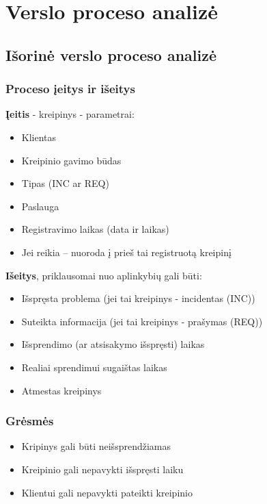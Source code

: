\section{Verslo proceso analizė}

	\subsection{Išorinė verslo proceso analizė}

		\subsubsection{Proceso įeitys ir išeitys}

			\textbf{Įeitis} - kreipinys - parametrai:
			\begin{itemize}
				\item Klientas
				\item Kreipinio gavimo būdas
				\item Tipas (INC ar REQ)
				\item Paslauga
				\item Registravimo laikas (data ir laikas)
				\item Jei reikia – nuoroda į prieš tai registruotą kreipinį
			\end{itemize}

			\textbf{Išeitys}, priklausomai nuo aplinkybių gali būti:
			\begin{itemize}
				\item Išspręsta problema (jei tai kreipinys - incidentas (INC))
				\item Suteikta informacija (jei tai kreipinys - prašymas (REQ))
				\item Išsprendimo (ar atsisakymo išspręsti) laikas
				\item Realiai sprendimui sugaištas laikas
				\item Atmestas kreipinys
			\end{itemize}

		\subsubsection{Grėsmės}
		
			\begin{itemize}
				\item Kripinys gali būti neišsprendžiamas
				\item Kreipinio gali nepavykti išspręsti laiku
				\item Klientui gali nepavykti pateikti kreipinio
			\end{itemize}
			
